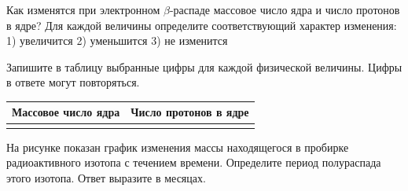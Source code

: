 \begin{taskbasic}[code={\label{task:nuclear_beta_mass_protons}}]
Как изменятся при электронном $\beta$-распаде массовое число ядра и число протонов в ядре? Для каждой величины определите соответствующий характер изменения:
1) увеличится
2) уменьшится
3) не изменится

Запишите в таблицу выбранные цифры для каждой физической величины. Цифры в ответе могут повторяться.

\nopagebreak\smallskip
\begin{center}
\small
\begin{tabular}{|c|c|}
\hline
Массовое число ядра & Число протонов в ядре \\ \hline
 & \\ \hline
\end{tabular}
\end{center}

\end{taskbasic}

\begin{taskbasic}[code={\label{task:nuclear_half_life_mass_graph}}]
На рисунке показан график изменения массы находящегося в пробирке радиоактивного изотопа с течением времени. Определите период полураспада этого изотопа. Ответ выразите в месяцах.

\nopagebreak\smallskip
\begin{center}
\end{center}

\end{taskbasic}

